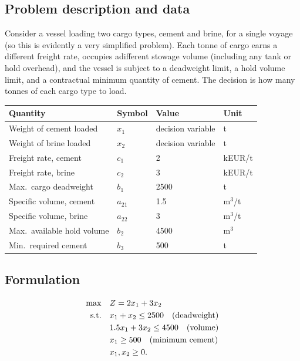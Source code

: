 \subsection{Problem description and data}

Consider a vessel loading two cargo types, cement and brine, for a single
voyage (so this is evidently a very simplified problem). Each tonne of cargo earns a different freight rate, occupies adifferent stowage volume (including any tank or hold overhead), and the vessel is subject to a deadweight limit, a hold volume limit, and a contractual minimum quantity of cement. The decision is how many tonnes of each cargo type to load.

\begin{center}
\begin{tabular}{@{}llll@{}}
\toprule
Quantity & Symbol & Value & Unit \\
\midrule
Weight of cement loaded & $x_1$ & decision variable & t \\
Weight of brine loaded & $x_2$ & decision variable & t \\
Freight rate, cement & $c_1$ & 2 & kEUR/t \\
Freight rate, brine & $c_2$ & 3 & kEUR/t \\
Max.\ cargo deadweight & $b_1$ & 2500 & t \\
Specific volume, cement & $a_{21}$ & 1.5 & m$^3$/t \\
Specific volume, brine & $a_{22}$ & 3 & m$^3$/t \\
Max.\ available hold volume & $b_2$ & 4500 & m$^3$ \\
Min.\ required cement & $b_3$ & 500 & t \\
\bottomrule
\end{tabular}
\end{center}

\subsection{Formulation}

\begin{align}
  \max \quad & Z = 2x_1 + 3x_2 \label{eq:cargomix}\\
  \text{s.t.} \quad & x_1 + x_2 \leq 2500 \quad \text{(deadweight)} \notag\\
  & 1.5x_1 + 3x_2 \leq 4500 \quad \text{(volume)} \notag\\
  & x_1 \geq 500 \quad \text{(minimum cement)} \notag\\
  & x_1, x_2 \geq 0. \notag
\end{align}

